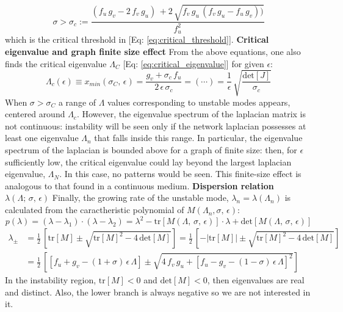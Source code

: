 {\begin{equation*}
 \sigma > \sigma_c :=  \frac{(f_u\,g_v - 2\,f_v\,g_u)\, + 2\,\sqrt{f_v\,g_u\,(f_v\,g_u-f_u\,g_v))}}{f_u^2}
\end{equation*}
which is the critical threshold in [Eq: \ref{eq:critical_threshold}]. \bigskip \newline \noindent
\textbf{Critical eigenvalue and graph finite size effect} \newline
From the above equations, one also finds the critical eigenvalue $\Lambda_C$ [Eq: \ref{eq:critical_eigenvalue}] for given $\epsilon$:
\begin{equation*}
    \Lambda_c(\epsilon) \equiv x_{min}(\sigma_C,\,\epsilon)= \frac{g_v + \sigma_c\,f_u}{2\,\epsilon \,\sigma_c} = (\cdots) = \frac{1}{\epsilon}\,\sqrt{\frac{\text{det}[J]}{\sigma_c}}
\end{equation*}
When $\sigma > \sigma_C$ a range of $\Lambda$ values corresponding to unstable modes appears, centered around $\Lambda_c$. However, the eigenvalue spectrum of the laplacian matrix is not continuous: instability will be seen only if the network laplacian possesses at least one eigenvalue $\Lambda_n$ that falls inside this range.
In particular, the eigenvalue spectrum of the laplacian is bounded above for a graph of finite size: then, for $\epsilon$ sufficiently low, the critical eigenvalue could lay beyond the largest laplacian eigenvalue, $\Lambda_N$. In this case, no patterns would be seen. This finite-size effect is analogous to that found in a continuous medium.
\bigskip \newline
\textbf{Dispersion relation $\lambda(\Lambda;\, \sigma,\,\epsilon)$} \newline
Finally, the growing rate of the unstable mode, $\lambda_n = \lambda(\Lambda_n)$ is calculated from the caractheristic polynomial of $M(\Lambda_n, \sigma,\,\epsilon)$:
\begin{equation*}
    p(\lambda) = (\lambda-\lambda_1)\cdot(\lambda-\lambda_2) = \lambda^2 - \text{tr}[M(\Lambda,\,\sigma,\,\epsilon)]\cdot \lambda + \text{det}[M(\Lambda,\,\sigma,\,\epsilon)]
\end{equation*}
\begin{align*}
    \lambda_{\pm} &=\frac{1}{2}\,\left[\text{tr}[M]\pm \sqrt{\text{tr}[M]^2-4\,\text{det}[M]}\right] = \frac{1}{2}\,\left[-|\text{tr}[M]|\pm \sqrt{\text{tr}[M]^2-4\,\text{det}[M]}\right] \\
    &= \frac{1}{2}\, \left[\left[f_u + g_v - (1+\sigma)\,\epsilon\,\Lambda\right] \pm \sqrt{4\,f_v\,g_u + \left[f_u - g_v -(1-\sigma)\,\epsilon\,\Lambda\right]^2}\right]
\end{align*}
In the instability region, $\text{tr}[M] <0$ and $\text{det}[M]<0$, then eigenvalues are real and distinct. Also, the lower branch is always negative so we are not interested in it. 
\small}

\newpage